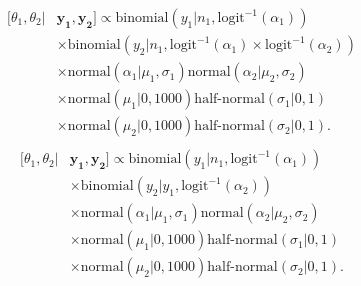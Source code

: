 \documentclass[12pt, oneside, titlepage]{article}   	%
\begin{document}
\begin{align}
  \begin{split}
 [  \theta_1, \theta_2  | & \bm{y_1} , \bm{y_2} ] \propto 
   \mathrm{binomial} ( y_1 | n_1, \mathrm{logit}^{-1}( \alpha_1 ) )  
      \\ & \times \mathrm{binomial} ( y_2 | n_1, \mathrm{logit}^{-1}( \alpha_1 ) \times \mathrm{logit}^{-1}( \alpha_2 ) ) 
   \\ & \times \mathrm{normal} ( \alpha_1  | \mu_1, \sigma_1 ) \mathrm{normal} ( \alpha_2  | \mu_2, \sigma_2 )
  \\ & \times \mathrm{normal} ( \mu_1 | 0 , 1000 ) \textrm{half-normal} ( \sigma_1 | 0,1)
    \\ & \times \mathrm{normal} ( \mu_2 | 0 , 1000 ) \textrm{half-normal} ( \sigma_2 | 0,1).
  \end{split}
\end{align}
%
\begin{align}
  \begin{split}
 [  \theta_1, \theta_2  | & \bm{y_1} , \bm{y_2} ] \propto 
   \mathrm{binomial} ( y_1 | n_1, \mathrm{logit}^{-1}( \alpha_1 ) )
      \\ & \times  \mathrm{binomial} ( y_2 | y_1, \mathrm{logit}^{-1}( \alpha_2 ) ) 
   \\ & \times \mathrm{normal} ( \alpha_1  | \mu_1, \sigma_1 ) \mathrm{normal} ( \alpha_2  | \mu_2, \sigma_2 )
  \\ & \times \mathrm{normal} ( \mu_1 | 0 , 1000 ) \textrm{half-normal} ( \sigma_1 | 0,1)
    \\ & \times \mathrm{normal} ( \mu_2 | 0 , 1000 ) \textrm{half-normal} ( \sigma_2 | 0,1).
  \end{split}
\end{align}
%

\clearpage
\newpage
\end{document}
